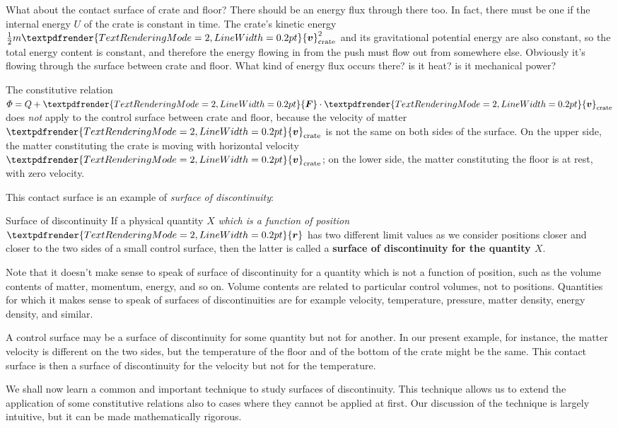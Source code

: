 \documentclass[a4paper,12pt,%
onecolumn,oneside,%
british%
]{memoir}
\renewcommand*{\bm}[1]{\textpdfrender{TextRenderingMode=2,LineWidth=0.2pt}{\boldsymbol{#1}}}
\renewcommand*{\|}[1][]{\nonscript\:#1\vert\nonscript\:\mathopen{}}
\newcommand*{\yr}{\bm{r}}
\newcommand*{\yv}{\bm{v}}
\newcommand*{\yvc}{\yv_{\textrm{crate}}}
\newcommand*{\ym}{m}%
\newcommand*{\yU}{U}
\newcommand*{\yH}{\varPhi}%
\newcommand*{\yQ}{Q}%
\newcommand*{\yF}{\bm{F}}
\begin{document}
What about the contact surface of crate and floor? There should be an energy flux through there too. In fact, there must be one if the internal energy $\yU$ of the crate is constant in time. The crate's kinetic energy $\tfrac12\ym \yvc^{2}$ and its gravitational potential energy are also constant, so the total energy content is constant, and therefore the energy flowing in from the push must flow out from somewhere else. Obviously it's flowing through the surface between crate and floor. What kind of energy flux occurs there? is it heat? is it mechanical power?

The constitutive relation $\yH = \yQ + \yF\cdot \yvc$ does \emph{not} apply to the control surface between crate and floor, because the velocity of matter $\yvc$ is not the same on both sides of the surface. On the upper side, the matter constituting the crate is moving with horizontal velocity $\yvc$; on the lower side, the matter constituting the floor is at rest, with zero velocity.

This contact surface is an example of \emph{surface of discontinuity}:
%
\begin{definition}{Surface of discontinuity}\label{def:surface_discontinuity}
If a physical quantity $X$ \emph{which is a function of position $\yr$} has two different limit values as we consider positions closer and closer to the two sides of a small control surface, then the latter is called a \textbf{surface of discontinuity for the quantity $X$}.
\end{definition}

Note that it doesn't make sense to speak of surface of discontinuity for a quantity which is not a function of position, such as the volume contents of matter, momentum, energy, and so on. Volume contents are related to particular control volumes, not to positions. Quantities for which it makes sense to speak of surfaces of discontinuities are for example velocity, temperature, pressure, matter density, energy density, and similar.

A control surface may be a surface of discontinuity for some quantity but not for another. In our present example, for instance, the matter velocity is different on the two sides, but the temperature of the floor and of the bottom of the crate might be the same. This contact surface is then a surface of discontinuity for the velocity but not for the temperature.

\medskip

We shall now learn a common and important technique to study surfaces of discontinuity. This technique allows us to extend the application of some constitutive relations also to cases where they cannot be applied at first. Our discussion of the technique is largely intuitive, but it can be made mathematically rigorous.
\end{document}
